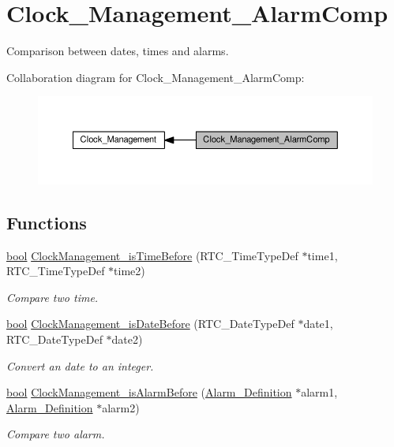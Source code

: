 \hypertarget{group___clock___management___alarm_comp}{}\section{Clock\+\_\+\+Management\+\_\+\+Alarm\+Comp}
\label{group___clock___management___alarm_comp}


Comparison between dates, times and alarms.  


Collaboration diagram for Clock\+\_\+\+Management\+\_\+\+Alarm\+Comp\+:\nopagebreak
\begin{figure}[H]
\begin{center}
\leavevmode
\includegraphics[width=350pt]{d7/dce/group___clock___management___alarm_comp}
\end{center}
\end{figure}
\subsection*{Functions}
\begin{DoxyCompactItemize}
\item 
\hyperlink{group___utils_gaf6a258d8f3ee5206d682d799316314b1}{bool} \hyperlink{group___clock___management___alarm_comp_gaad24166797ca90cee706c0d8f4983560}{Clock\+Management\+\_\+is\+Time\+Before} (R\+T\+C\+\_\+\+Time\+Type\+Def $\ast$time1, R\+T\+C\+\_\+\+Time\+Type\+Def $\ast$time2)
\begin{DoxyCompactList}\small\item\em Compare two time. \end{DoxyCompactList}\item 
\hyperlink{group___utils_gaf6a258d8f3ee5206d682d799316314b1}{bool} \hyperlink{group___clock___management___alarm_comp_ga8e277f1ee687458304a10016dec2dbf7}{Clock\+Management\+\_\+is\+Date\+Before} (R\+T\+C\+\_\+\+Date\+Type\+Def $\ast$date1, R\+T\+C\+\_\+\+Date\+Type\+Def $\ast$date2)
\begin{DoxyCompactList}\small\item\em Convert an date to an integer. \end{DoxyCompactList}\item 
\hyperlink{group___utils_gaf6a258d8f3ee5206d682d799316314b1}{bool} \hyperlink{group___clock___management___alarm_comp_gaba2475baa28dfdc82e7a51a19fa8a7b9}{Clock\+Management\+\_\+is\+Alarm\+Before} (\hyperlink{group__type_d4/d90/struct_alarm___definition}{Alarm\+\_\+\+Definition} $\ast$alarm1, \hyperlink{group__type_d4/d90/struct_alarm___definition}{Alarm\+\_\+\+Definition} $\ast$alarm2)
\begin{DoxyCompactList}\small\item\em Compare two alarm. \end{DoxyCompactList}\end{DoxyCompactItemize}


